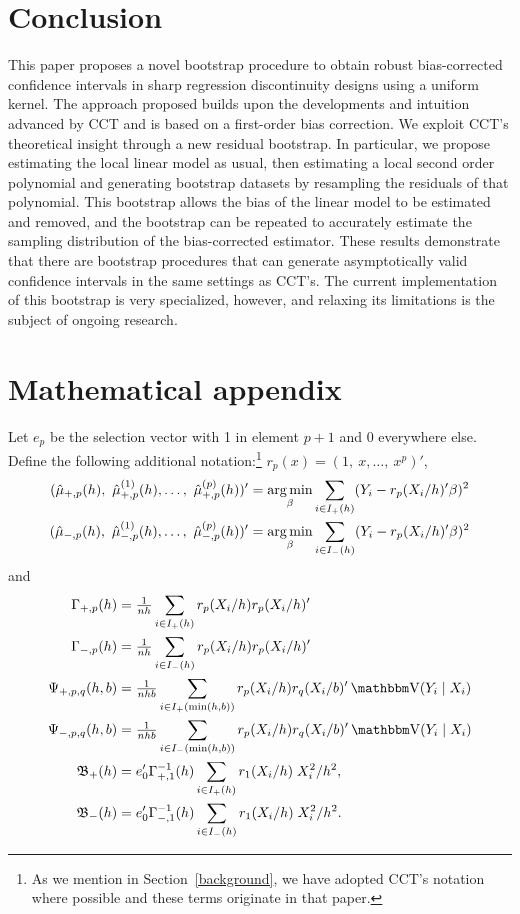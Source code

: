 \documentclass[12pt,fleqn]{article}
\begin{document}
\section{Conclusion}\label{conclusion}

This paper proposes a novel bootstrap procedure to obtain robust bias-corrected
confidence intervals in sharp regression discontinuity designs using a uniform
kernel. The approach proposed builds upon the developments and intuition
advanced by CCT and is based on a first-order bias correction. We exploit CCT's
theoretical insight through a new residual bootstrap. In particular, we propose
estimating the local linear model as usual, then estimating a local second order
polynomial and generating bootstrap datasets by resampling the residuals of that
polynomial. This bootstrap allows the bias of the linear model to be estimated
and removed, and the bootstrap can be repeated to accurately estimate the
sampling distribution of the bias-corrected estimator. These results demonstrate
that there are bootstrap procedures that can generate asymptotically valid
confidence intervals in the same settings as CCT's. The current implementation
of this bootstrap is very specialized, however, and relaxing its limitations
is the subject of ongoing research.

\appendix
\section{Mathematical appendix}
Let $e_p$ be the selection vector with 1 in element $p+1$ and 0
everywhere else. Define the following additional notation:\footnote{%
  As we mention in Section~\ref{background}, we have adopted CCT's
  notation where possible and these terms originate in that paper.} %
$r_p(x) = (1,\ x,\dots,\ x^p)'$,
\begin{align*}
  (\hat{\mu}_{+,p}(h),\ \hat{\mu}_{+,p}^{(1)}(h),\dots,\ \hat\mu_{+,p}^{(p)}(h))'
  &= \argmin_{\beta} \ssum[+]{i}{h} (Y_i - r_p(X_i/h)'\beta)^2 \\
  (\hat{\mu}_{-,p}(h),\ \hat{\mu}_{-,p}^{(1)}(h),\dots,\ \hat\mu_{-,p}^{(p)}(h))'
  &= \argmin_{\beta} \ssum[-]{i}{h} (Y_i - r_p(X_i/h)'\beta)^2
\end{align*}
and
\begin{align*}
  \Gamma_{+,p}(h) &= \tfrac{1}{nh} \ssum[+]{i}{h} r_p(X_i/h) r_p(X_i/h)' \\
  \Gamma_{-,p}(h) &= \tfrac{1}{nh} \ssum[-]{i}{h} r_p(X_i/h) r_p(X_i/h)' \\
  \Psi_{+,p,q}(h,b)
  &= \tfrac{1}{nhb} \ssum[+]{i}{\min(h,b)} r_p(X_i/h) r_q(X_i/b)'
    \V(Y_i \mid X_i) \\
  \Psi_{-,p,q}(h,b)
  &= \tfrac{1}{nhb} \ssum[-]{i}{\min(h,b)} r_p(X_i/h) r_q(X_i/b)'
    \V(Y_i \mid X_i) \\
  \Bf_+(h)
  & = e_0' \Gamma_{+,1}^{-1}(h)
    \ssum[+]{i}{h} r_1(X_i/h) \; X_i^2 / h^2, \\
  \Bf_-(h)
  & = e_0' \Gamma_{-,1}^{-1}(h)
    \ssum[-]{i}{h} r_1(X_i/h) \; X_i^2 / h^2.
\end{align*}
\end{document}
